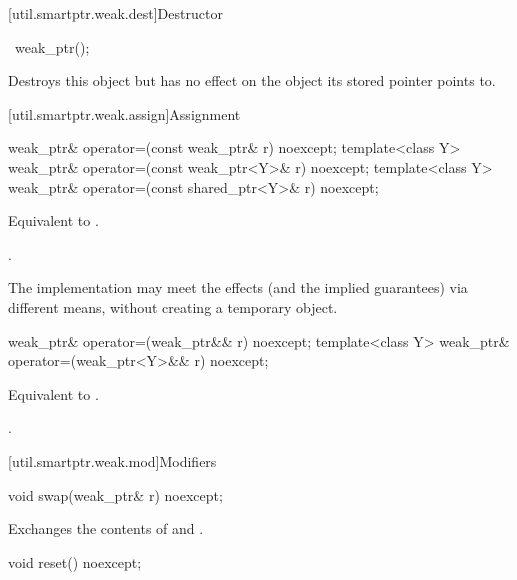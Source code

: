 [util.smartptr.weak.dest]{Destructor}

%
\begin{itemdecl}
~weak_ptr();
\end{itemdecl}

\begin{itemdescr}
\pnum
\effects
Destroys this  object but has no
effect on the object its stored pointer points to.
\end{itemdescr}

[util.smartptr.weak.assign]{Assignment}

%
\begin{itemdecl}
weak_ptr& operator=(const weak_ptr& r) noexcept;
template<class Y> weak_ptr& operator=(const weak_ptr<Y>& r) noexcept;
template<class Y> weak_ptr& operator=(const shared_ptr<Y>& r) noexcept;
\end{itemdecl}

\begin{itemdescr}
\pnum
\effects
Equivalent to .

\pnum
\returns
{}.

\pnum
\remarks
The implementation may meet the effects (and the
implied guarantees) via different means, without creating a temporary object.
\end{itemdescr}

%
\begin{itemdecl}
weak_ptr& operator=(weak_ptr&& r) noexcept;
template<class Y> weak_ptr& operator=(weak_ptr<Y>&& r) noexcept;
\end{itemdecl}

\begin{itemdescr}
\pnum
\effects
Equivalent to .

\pnum
\returns
{}.
\end{itemdescr}

[util.smartptr.weak.mod]{Modifiers}
%
\begin{itemdecl}
void swap(weak_ptr& r) noexcept;
\end{itemdecl}

\begin{itemdescr}
\pnum
\effects
Exchanges the contents of  and .
\end{itemdescr}

%
\begin{itemdecl}
void reset() noexcept;
\end{itemdecl}


